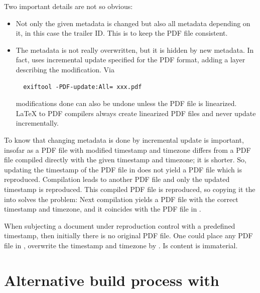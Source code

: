 Two important details are not so obvious: 
%
\begin{itemize}
\item
Not only the given metadata is changed but also all metadata depending on it, 
in this case the trailer ID\@. 
This is to keep the PDF file consistent. 
\item 
The metadata is not really overwritten, but it is hidden by new metadata. 
In fact,  uses incremental update specified for the PDF format, 
adding a layer describing the modification. 
Via
%
\begin{verbatim}
  exiftool -PDF-update:All= xxx.pdf
\end{verbatim}
%
modifications done can also be undone unless the PDF file is linearized. 
\LaTeX{} to PDF compilers always create linearized PDF files and never update incrementally. 
\end{itemize}


To know that changing metadata is done by incremental update is important, 
insofar as a PDF file with modified timestamp and timezone  
differs from a PDF file compiled directly with the given timestamp and timezone; 
it is shorter. 
So, updating the timestamp of the PDF file in  
does not yield a PDF file which is reproduced. 
Compilation leads to another PDF file and only the updated timestamp is reproduced. 
This compiled PDF file is reproduced, so 
copying it the into  solves the problem: 
Next compilation yields a PDF file with the correct timestamp and timezone, 
and it coincides with the PDF file in . 

When subjecting a document under reproduction control with a predefined timestamp, 
then initially there is no original PDF file. 
One could place any PDF file in , 
overwrite the timestamp and timezone by . 
Is content is immaterial. 




\section{Alternative build process with \protect{}}\label{sec:latexmk}%

